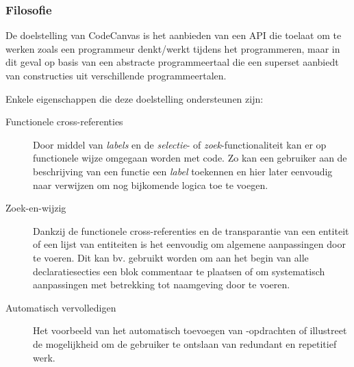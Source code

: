 \subsubsection{Filosofie}

De doelstelling van CodeCanvas is het aanbieden van een API die toelaat om te
werken zoals een programmeur denkt/werkt tijdens het programmeren, maar in dit
geval op basis van een abstracte programmeertaal die een superset aanbiedt van
constructies uit verschillende programmeertalen.

Enkele eigenschappen die deze doelstelling ondersteunen zijn:

\begin{description}

  \item[Functionele cross-referenties] Door middel van \emph{labels} en de
  \emph{selectie}- of \emph{zoek}-functionaliteit kan er op functionele wijze
  omgegaan worden met code. Zo kan een gebruiker aan de beschrijving van een
  functie een \emph{label} toekennen en hier later eenvoudig naar verwijzen om
  nog bijkomende logica toe te voegen.

  \item[Zoek-en-wijzig] Dankzij de functionele cross-referenties en de
  transparantie van een entiteit of een lijst van entiteiten is het eenvoudig
  om algemene aanpassingen door te voeren. Dit kan bv. gebruikt worden om aan
  het begin van alle declaratiesecties een blok commentaar te plaatsen of om
  systematisch aanpassingen met betrekking tot naamgeving door te voeren.

  \item[Automatisch vervolledigen] Het voorbeeld van het automatisch toevoegen
  van -opdrachten of  illustreet de mogelijkheid om
  de gebruiker te ontslaan van redundant en repetitief werk.

\end{description}
